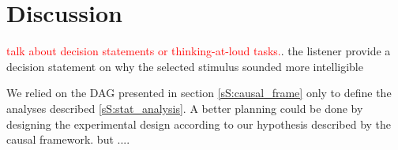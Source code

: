 \section{Discussion} \label{S:discussion}

\textcolor{red}{talk about decision statements or thinking-at-loud tasks.}. the listener provide a decision statement on why the selected stimulus sounded more intelligible

We relied on the DAG presented in section \ref{sS:causal_frame} only to define the analyses described \ref{sS:stat_analysis}. A better planning could be done by designing the experimental design according to our hypothesis described by the causal framework. but ....